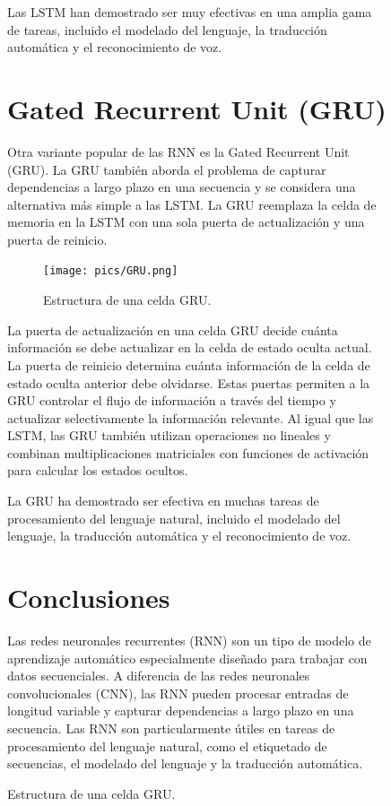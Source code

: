 \documentclass{book}
\begin{document}
\begin{figure}[h]
{Las LSTM han demostrado ser muy efectivas en una amplia gama de tareas, incluido el modelado del lenguaje, la traducción automática y el reconocimiento de voz.

\section{Gated Recurrent Unit (GRU)}

Otra variante popular de las RNN es la Gated Recurrent Unit (GRU). La GRU también aborda el problema de capturar dependencias a largo plazo en una secuencia y se considera una alternativa más simple a las LSTM. La GRU reemplaza la celda de memoria en la LSTM con una sola puerta de actualización y una puerta de reinicio.

\begin{figure}[h]
  \centering
  \texttt{[image: pics/GRU.png]}
  \caption{Estructura de una celda GRU.}
\end{figure}

La puerta de actualización en una celda GRU decide cuánta información se debe actualizar en la celda de estado oculta actual. La puerta de reinicio determina cuánta información de la celda de estado oculta anterior debe olvidarse. Estas puertas permiten a la GRU controlar el flujo de información a través del tiempo y actualizar selectivamente la información relevante. Al igual que las LSTM, las GRU también utilizan operaciones no lineales y combinan multiplicaciones matriciales con funciones de activación para calcular los estados ocultos.

La GRU ha demostrado ser efectiva en muchas tareas de procesamiento del lenguaje natural, incluido el modelado del lenguaje, la traducción automática y el reconocimiento de voz.

\section{Conclusiones}

Las redes neuronales recurrentes (RNN) son un tipo de modelo de aprendizaje automático especialmente diseñado para trabajar con datos secuenciales. A diferencia de las redes neuronales convolucionales (CNN), las RNN pueden procesar entradas de longitud variable y capturar dependencias a largo plazo en una secuencia. Las RNN son particularmente útiles en tareas de procesamiento del lenguaje natural, como el etiquetado de secuencias, el modelado del lenguaje y la traducción automática.

}
\end{figure}
\end{document}
